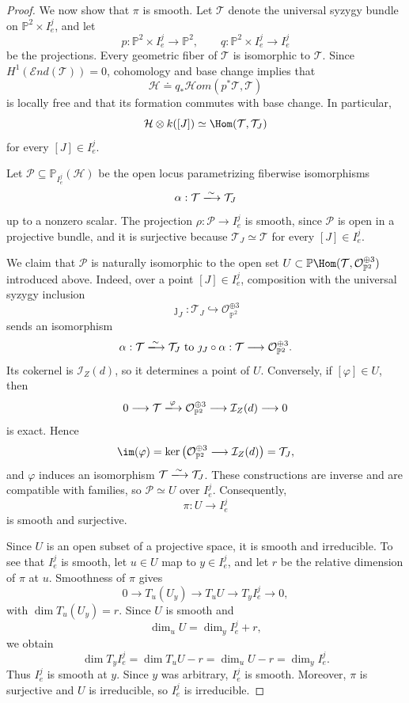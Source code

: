 \documentclass[11pt]{amsart} %
\newcommand{\lar}{\longrightarrow}
\theoremstyle{definition}
\def\ker{{\rm ker}\,}
\def\NZQ{\mathbb}               %
\def\PP{{\NZQ P}}
\def\T{{\mathcal T}}
\begin{document}
\begin{proof}
We now show that $\pi$ is smooth. Let $\mathscr T$ denote the
universal syzygy bundle on \(\PP^2\times I_e^j\), and let
\[
p:\PP^2\times I_e^j\lar\PP^2,
\qquad
q:\PP^2\times I_e^j\lar I_e^j
\]
be the projections. Every geometric fiber of $\mathscr T$ is
isomorphic to $\T$. Since \(H^1(\mathcal End(\T))=0\), cohomology and base change
\cite[Chapter~III, Theorem~12.11]{hartshorne2013algebraic}
implies that
\[
\mathcal H
\doteq
q_*\mathcal Hom(p^*\T,\mathscr T)
\]
is locally free and that its formation commutes with base change.
In particular,
\[
\mathcal H\otimes k([J])
\simeq
\Hom(\T,\T_J)
\]
for every $[J]\in I_e^j$.

Let \(\mathscr P\subseteq\PP_{I_e^j}(\mathcal H)\) be the open locus parametrizing fiberwise isomorphisms
\[
\alpha:\T\xlongrightarrow{\sim}\T_J
\]
up to a nonzero scalar. The projection \(\rho:\mathscr P\longrightarrow I_e^j
\) is smooth, since $\mathscr P$ is open in a projective bundle, and it
is surjective because $\T_J\simeq\T$ for every $[J]\in I_e^j$.

We claim that $\mathscr P$ is naturally isomorphic to the open set
$U\subset\PP\Hom(\T,\mathcal O_{\PP^2}^{\oplus3})$ introduced
above. Indeed, over a point $[J]\in I_e^j$, composition with the
universal syzygy inclusion
\[
\jmath_J:\T_J\hookrightarrow\mathcal O_{\PP^2}^{\oplus3}
\]
sends an isomorphism
\[
\alpha:\T\xlongrightarrow{\sim}\T_J \text{ to } \jmath_J\circ\alpha:
\T\longrightarrow\mathcal O_{\PP^2}^{\oplus3}.
\]
Its cokernel is $\mathcal I_Z(d)$, so it determines a point of $U$. Conversely, if $[\varphi]\in U$, then
\[
0\longrightarrow\T
\xlongrightarrow{\varphi}
\mathcal O_{\PP^2}^{\oplus3}
\longrightarrow\mathcal I_Z(d)
\longrightarrow0
\]
is exact. Hence
\[
\im(\varphi)
=
\ker\bigl(
\mathcal O_{\PP^2}^{\oplus3}
\lar\mathcal I_Z(d)
\bigr)
=
\T_J,
\]
and $\varphi$ induces an isomorphism \(\T\xlongrightarrow{\sim}\T_J\). These constructions are inverse and are compatible with families, so \(\mathscr P\simeq U \)
over $I_e^j$. Consequently,
\[
\pi:U\longrightarrow I_e^j
\]
is smooth and surjective.

Since $U$ is an open subset of a projective space, it is smooth and
irreducible. To see that $I_e^j$ is smooth, let $u\in U$ map to
$y\in I_e^j$, and let $r$ be the relative dimension of $\pi$ at
$u$. Smoothness of $\pi$ gives
\[
0\longrightarrow T_u(U_y)
\longrightarrow T_uU
\longrightarrow T_yI_e^j
\longrightarrow0,
\]
with \( \dim T_u(U_y)=r\). Since $U$ is smooth and
\[
\dim_uU=\dim_yI_e^j+r,
\]
we obtain
\[
\dim T_yI_e^j
=
\dim T_uU-r
=
\dim_uU-r
=
\dim_yI_e^j.
\]
Thus $I_e^j$ is smooth at $y$. Since $y$ was arbitrary,
$I_e^j$ is smooth. Moreover, $\pi$ is surjective and $U$ is irreducible, so
$I_e^j$ is irreducible.


\end{proof}
\end{document}
